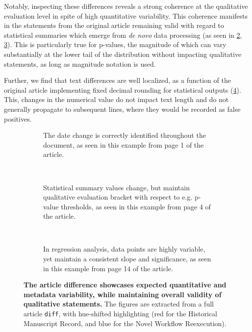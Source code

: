 Notably, inspecting these differences reveals a strong coherence at the qualitative evaluation level in spite of high quantitative variability.
This coherence manifests in the statements from the original article remaining valid with regard to statistical summaries which emerge from  \textit{de novo} data processing (as seen in \ref{fig:diff_text}, \ref{fig:diff_fig}).
This is particularly true for p-values, the magnitude of which can vary substantially at the lower tail of the distribution without impacting qualitative statements, as long as magnitude notation is used.

Further, we find that text differences are well localized, as a function of the original article implementing fixed decimal rounding for statistical outputs (\cref{fig:diff}).
This, changes in the numerical value do not impact text length and do not generally propagate to subsequent lines, where they would be recorded as false positives.

\begin{figure}[H]
	\centering
	\begin{subfigure}{0.99\textwidth}
		\centering
		\caption{
			The date change is correctly identified throughout the document, as seen in this example from page 1 of the article.
		}
		\label{fig:diff_date}
	\end{subfigure}
	\\
	\begin{subfigure}{0.99\textwidth}
		\centering
		\caption{
			Statistical summary values change, but maintain qualitative evaluation bracket with respect to e.g. p-value thresholds, as seen in this example from page 4 of the article.
		}
		\label{fig:diff_text}
	\end{subfigure}
	\\
	\vspace{1em}
	\begin{subfigure}{0.99\textwidth}
		\centering
		\caption{
			In regression analysis, data points are highly variable, yet maintain a consistent slope and significance, as seen in this example from page 14 of the article.
		}
		\label{fig:diff_fig}
	\end{subfigure}
	\caption{
		\textbf{The article difference showcases expected quantitative and metadata variability, while maintaining overall validity of qualitative statements.}
		The figures are extracted from a full article \texttt{diff}, with hue-shifted highlighting (red for the Historical Manuscript Record, and blue for the Novel Workflow Reexecution).
	}
	\label{fig:diff}
\end{figure}

